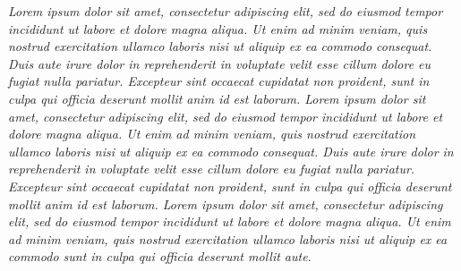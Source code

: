 {{             \rightsideindent \leftsideindent%
             \rightsideindent \leftsideindent%
            0pc \hsize%
{\it Lorem ipsum dolor sit amet, consectetur adipiscing elit, sed do eiusmod tempor incididunt ut labore et dolore magna aliqua. Ut enim ad minim veniam, quis nostrud exercitation ullamco laboris nisi ut aliquip ex ea commodo consequat. Duis aute irure dolor in reprehenderit in voluptate velit esse cillum dolore eu fugiat nulla pariatur. Excepteur sint occaecat cupidatat non proident, sunt in culpa qui officia deserunt mollit anim id est laborum.
Lorem ipsum dolor sit amet, consectetur adipiscing elit, sed do eiusmod tempor incididunt ut labore et dolore magna aliqua. Ut enim ad minim veniam, quis nostrud exercitation ullamco laboris nisi ut aliquip ex ea commodo consequat. Duis aute irure dolor in reprehenderit in voluptate velit esse cillum dolore eu fugiat nulla pariatur. Excepteur sint occaecat cupidatat non proident, sunt in culpa qui officia deserunt mollit anim id est laborum.
Lorem ipsum dolor sit amet, consectetur adipiscing elit, sed do eiusmod tempor incididunt ut labore et dolore magna aliqua. Ut enim ad minim veniam, quis nostrud exercitation ullamco laboris nisi ut aliquip ex ea commodo sunt in culpa qui officia deserunt mollit aute.}
\par%
\baselineskip%
\vtop{\parindent=0pc\hsize14pc\rightskip6.666pc%
\Black\typosize[12/15.5]\it\myorange%
    {\rm\char"2767} %
    A B C D E F G\parfillskip0pt\par H I J K L M N O P Q {\char"008B} R S T U V W X Y Z Å Ä Æ Ö      
\parfillskip0pt\par
    {\setff{+lnum,+pnum}\currvar
        1 2 3 4 5 6 7 8 9 0
    }
    a b c d e f g h i j k\parfillskip0pt\par l m n o p q r s t u v {\char"0086} w x y z å ä æ ö
    {\char"0251} %
    {\char"FB00} %
    {\char"FB01} %
    fj
    {\char"FB02} %
    [ ( \{ {\char"009F} \} ) ]
    1 2 3 4 5 6 7 8 9 0 
    \&\parfillskip0pt\par %
    “ ‘ - . : * ; , -- ’ ” --- ? !
    \parfillskip0pt\par       
    {\setff{+smcp}\currvar%
        a b c d e f g h i 
        j k l m n o p q 
        r s t u v w x y z {\char"00A7} 
    }\parfillskip0pt\par%
    {\char"00B6}
    Α Β Γ Δ Ε Ζ Η Θ Ι Κ Λ Μ Ν Ξ Ο Π Ρ Σ Τ Υ Φ Χ Ψ Ω  
    α β γ δ ε ζ η θ ι κ λ μ ν ξ ο π ρ σ τ υ φ χ ψ ω
}%
}%
}%

